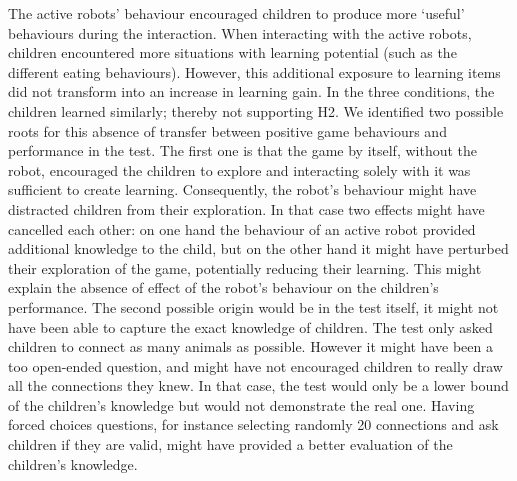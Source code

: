 The active robots' behaviour encouraged children to produce more `useful' behaviours during the interaction. When interacting with the active robots, children encountered more situations with learning potential (such as the different eating behaviours). However, this additional exposure to learning items did not transform into an increase in learning gain. In the three conditions, the children learned similarly; thereby not supporting H2. We identified two possible roots for this absence of transfer between positive game behaviours and performance in the test. The first one is that the game by itself, without the robot, encouraged the children to explore and interacting solely with it was sufficient to create learning. Consequently, the robot's behaviour might have distracted children from their exploration. In that case two effects might have cancelled each other: on one hand the behaviour of an active robot provided additional knowledge to the child, but on the other hand it might have perturbed their exploration of the game, potentially reducing their learning. This might explain the absence of effect of the robot's behaviour on the children's performance. The second possible origin would be in the test itself, it might not have been able to capture the exact knowledge of children. The test only asked children to connect as many animals as possible. However it might have been a too open-ended question, and might have not encouraged children to really draw all the connections they knew. In that case, the test would only be a lower bound of the children's knowledge but would not demonstrate the real one. Having forced choices questions, for instance selecting randomly 20 connections and ask children if they are valid, might have provided a better evaluation of the children's knowledge. 



